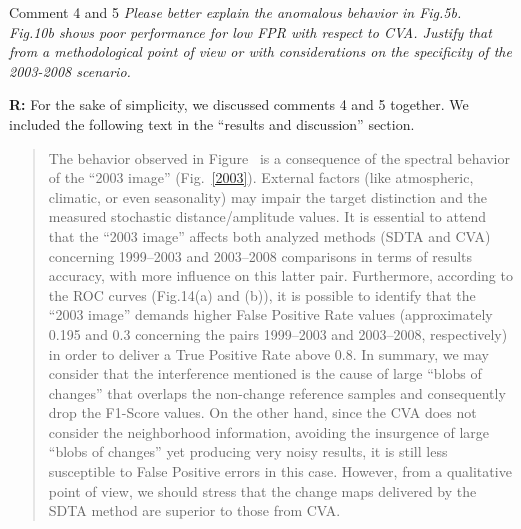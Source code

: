 \documentclass[11pt]{report}
\begin{document}
\vspace{0.3cm}



\medskip
\begin{mybox}{Comment 4 and 5}
\textit{Please better explain the anomalous behavior in Fig.5b.
\\
Fig.10b shows poor performance for low FPR with respect to CVA. Justify that from a methodological point of view or with considerations on the specificity of the 2003-2008 scenario.
}

\medskip

\textbf{R:} For the sake of simplicity, we discussed comments 4 and 5 together. We included the following text in the ``results and discussion'' section.

\medskip


\begin{quotation}

The behavior observed in Figure~\cite{5b} is a consequence of the spectral behavior of the ``2003 image'' (Fig.~\ref{2003}). External factors (like atmospheric, climatic, or even seasonality) may impair the target distinction and the measured stochastic distance/amplitude values.
%
It is essential to attend that the ``2003 image'' affects both analyzed methods (SDTA and CVA) concerning 1999--2003 and 2003--2008 comparisons in terms of results accuracy, with more influence on this latter pair.
%
Furthermore, according to the ROC curves (Fig.14(a) and (b)), it is possible to identify that the ``2003 image'' demands higher False Positive Rate values (approximately 0.195 and 0.3 concerning the pairs 1999--2003 and 2003--2008, respectively) in order to deliver a True Positive Rate above 0.8.
%
In summary, we may consider that the interference mentioned is the cause of large ``blobs of changes'' that overlaps the non-change reference samples and consequently drop the F1-Score values.
%
On the other hand, since the CVA does not consider the neighborhood information, avoiding the insurgence of large ``blobs of changes'' yet producing very noisy results, it is still less susceptible to False Positive errors in this case.
%
However, from a qualitative point of view, we should stress that the change maps delivered by the SDTA method are superior to those from CVA.


\end{quotation}



\end{mybox}
\end{document}
